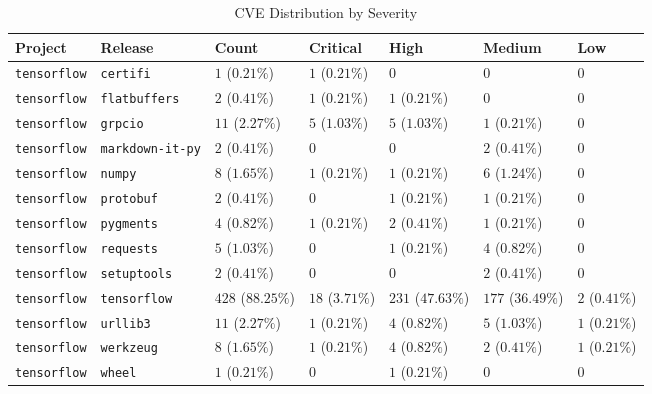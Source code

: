 \begin{table}
\caption{CVE Distribution by Severity}
\label{tab:cve-distribution}
\begin{tabular}{lllllll}
\toprule
Project & Release & Count & Critical & High & Medium & Low \\
\midrule
\texttt{tensorflow} & \texttt{certifi} & $1$ ($0.21\%$) & $1$ ($0.21\%$) & $0$ & $0$ & $0$ \\
\texttt{tensorflow} & \texttt{flatbuffers} & $2$ ($0.41\%$) & $1$ ($0.21\%$) & $1$ ($0.21\%$) & $0$ & $0$ \\
\texttt{tensorflow} & \texttt{grpcio} & $11$ ($2.27\%$) & $5$ ($1.03\%$) & $5$ ($1.03\%$) & $1$ ($0.21\%$) & $0$ \\
\texttt{tensorflow} & \texttt{markdown-it-py} & $2$ ($0.41\%$) & $0$ & $0$ & $2$ ($0.41\%$) & $0$ \\
\texttt{tensorflow} & \texttt{numpy} & $8$ ($1.65\%$) & $1$ ($0.21\%$) & $1$ ($0.21\%$) & $6$ ($1.24\%$) & $0$ \\
\texttt{tensorflow} & \texttt{protobuf} & $2$ ($0.41\%$) & $0$ & $1$ ($0.21\%$) & $1$ ($0.21\%$) & $0$ \\
\texttt{tensorflow} & \texttt{pygments} & $4$ ($0.82\%$) & $1$ ($0.21\%$) & $2$ ($0.41\%$) & $1$ ($0.21\%$) & $0$ \\
\texttt{tensorflow} & \texttt{requests} & $5$ ($1.03\%$) & $0$ & $1$ ($0.21\%$) & $4$ ($0.82\%$) & $0$ \\
\texttt{tensorflow} & \texttt{setuptools} & $2$ ($0.41\%$) & $0$ & $0$ & $2$ ($0.41\%$) & $0$ \\
\texttt{tensorflow} & \texttt{tensorflow} & $428$ ($88.25\%$) & $18$ ($3.71\%$) & $231$ ($47.63\%$) & $177$ ($36.49\%$) & $2$ ($0.41\%$) \\
\texttt{tensorflow} & \texttt{urllib3} & $11$ ($2.27\%$) & $1$ ($0.21\%$) & $4$ ($0.82\%$) & $5$ ($1.03\%$) & $1$ ($0.21\%$) \\
\texttt{tensorflow} & \texttt{werkzeug} & $8$ ($1.65\%$) & $1$ ($0.21\%$) & $4$ ($0.82\%$) & $2$ ($0.41\%$) & $1$ ($0.21\%$) \\
\texttt{tensorflow} & \texttt{wheel} & $1$ ($0.21\%$) & $0$ & $1$ ($0.21\%$) & $0$ & $0$ \\
\bottomrule
\end{tabular}
\end{table}

